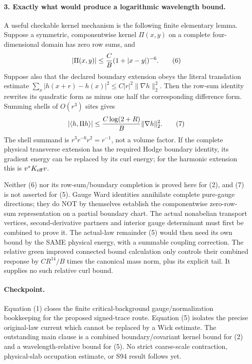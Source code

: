 \documentclass[11pt]{article}
\begin{document}
\paragraph{3. Exactly what would produce a logarithmic wavelength bound.}
A useful checkable kernel mechanism is the following finite elementary
lemma. Suppose a symmetric, componentwise kernel $\Pi(x,y)$ on a complete
four-dimensional domain has zero row sums, and
\[
 |\Pi(x,y)|\le {C\over B}(1+|x-y|)^{-6}.                            \tag{6}
\]
Suppose also that the declared boundary extension obeys the literal
translation estimate
$\sum_x|h(x+r)-h(x)|^2\le C|r|^2\|\nabla h\|_2^2$.
Then the row-sum identity rewrites its quadratic form as minus one half
the corresponding difference form. Summing shells of $O(r^3)$ sites gives
\[
 |\langle h,\Pi h\rangle|
 \le {C\log(2+R)\over B}\|\nabla h\|_2^2.                         \tag{7}
\]
The shell summand is $r^3r^{-6}r^2=r^{-1}$, not a volume factor.
If the complete physical transverse extension has the required Hodge
boundary identity, its gradient energy can be replaced by its curl energy;
for the harmonic extension this is $v^*K_{\rm eff}v$.

Neither (6) nor its row-sum/boundary completion is proved here for (2),
and (7) is not asserted for (5). Gauge Ward identities annihilate complete
pure-gauge directions; they do NOT by themselves establish the componentwise
zero-row-sum representation on a partial boundary chart. The actual
nonabelian transport vertices, second-derivative partners and interior
gauge determinant must first be combined to prove it. The actual-law
remainder (5) would then need its own bound by the SAME physical energy,
with a summable coupling correction. The relative green improved connected bound calculation only controls their
combined response by $CR^{14}/B$ times the canonical mass norm, plus its
explicit tail. It supplies no such relative curl bound.

\paragraph{Checkpoint.}
Equation (1) closes the finite critical-background gauge/normalization
bookkeeping for the proposed signed-trace route. Equation (5) isolates the
precise original-law current which cannot be replaced by a Wick estimate.
The outstanding main clause is a combined boundary/covariant kernel bound
for (2) and a wavelength-relative bound for (5). No strict coarse-scale
contraction, physical-slab occupation estimate, or S94 result follows yet.
\end{document}
